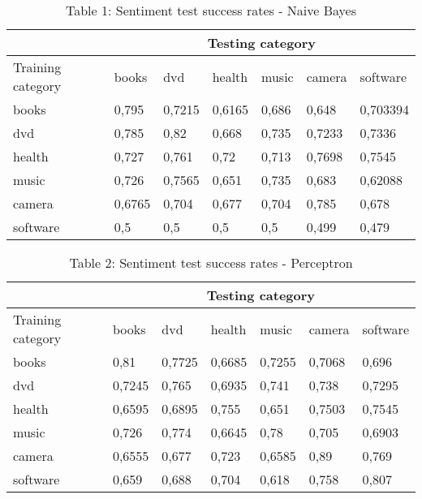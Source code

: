 \begin{table}[htdp]
\caption*{Table 1: Sentiment test success rates - Naive Bayes}
\begin{center}
\begin{tabular}{ | l | l | l | l | l | l | l |}

\hline
& \multicolumn{6}{|c|}{Testing category}\\
\hline
Training category &books &dvd &health  &music &camera  &software \\
\hline
books & 0,795 & 0,7215 & 0,6165  & 0,686 & 0,648 & 0,703394 \\
dvd & 0,785 & 0,82  & 0,668 & 0,735 & 0,7233  & 0,7336 \\
health  & 0,727 & 0,761 & 0,72  & 0,713 & 0,7698  & 0,7545 \\
music & 0,726 & 0,7565  & 0,651 & 0,735 & 0,683 & 0,62088 \\
camera  & 0,6765  & 0,704 & 0,677 & 0,704 & 0,785 & 0,678 \\
software  & 0,5 & 0,5 & 0,5 & 0,5 & 0,499 & 0,479 \\
\hline

\end{tabular}
\end{center}
\label{default}
\end{table}


\begin{table}[htdp]
\caption*{Table 2: Sentiment test success rates - Perceptron}
\begin{center}
\begin{tabular}{ | l | l | l | l | l | l | l |}

\hline
& \multicolumn{6}{|c|}{Testing category}\\
\hline
Training category &books &dvd &health  &music &camera  &software \\
\hline
books & 0,81  & 0,7725  & 0,6685  & 0,7255  & 0,7068  & 0,696\\
dvd & 0,7245  & 0,765 & 0,6935  & 0,741 & 0,738 & 0,7295\\
health  & 0,6595  & 0,6895  & 0,755 & 0,651 & 0,7503  & 0,7545\\
music & 0,726 & 0,774 & 0,6645  & 0,78  & 0,705 & 0,6903\\
camera  & 0,6555  & 0,677 & 0,723 & 0,6585  & 0,89  & 0,769\\
software  & 0,659 & 0,688 & 0,704 & 0,618 & 0,758 & 0,807\\
\hline

\end{tabular}
\end{center}
\label{default}
\end{table}


